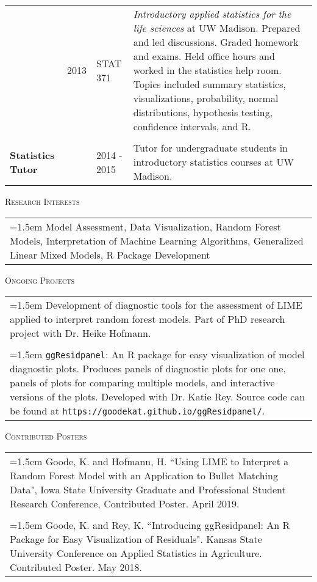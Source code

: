 \documentclass[10pt, oneside]{article}
\begin{document}
\begin{longtable}{p{2cm}p{1cm}p{2cm}p{11.5cm}}
\\
& \hfill{2013} & STAT 371 & \emph{Introductory applied statistics for the life sciences} at UW Madison. Prepared and led discussions. Graded homework and exams. Held office hours and worked in the statistics help room. Topics included summary statistics, visualizations, probability, normal distributions, hypothesis testing, confidence intervals, and R.\\
\\
\textbf{Statistics Tutor} & & 2014 - 2015 & Tutor for undergraduate students in introductory statistics courses at UW Madison.
\end{longtable}

\noindent \textsc{Research Interests} \hrulefill
\begin{longtable}{p{16.5cm}}
\hangindent=1.5em Model Assessment, Data Visualization, Random Forest Models, Interpretation of Machine Learning Algorithms, Generalized Linear Mixed Models, R Package Development
\end{longtable}

\noindent \textsc{Ongoing Projects} \hrulefill
\begin{longtable}{p{16.5cm}}
\hangindent=1.5em Development of diagnostic tools for the assessment of LIME applied to interpret random forest models. Part of PhD research project with Dr. Heike Hofmann.\\
\\
\hangindent=1.5em \texttt{ggResidpanel}: An R package for easy visualization of model diagnostic plots. Produces panels of diagnostic plots for one one, panels of plots for comparing multiple models, and interactive versions of the plots. Developed with Dr. Katie Rey. Source code can be found at \texttt{https://goodekat.github.io/ggResidpanel/}.
\end{longtable}

\noindent \textsc{Contributed Posters} \hrulefill
\begin{longtable}{p{16.5cm}}
\hangindent=1.5em Goode, K. and Hofmann, H. ``Using LIME to Interpret a Random Forest Model with an Application to Bullet Matching Data", Iowa State University Graduate and Professional Student Research Conference, Contributed Poster. April 2019.\\
\\ 
\hangindent=1.5em Goode, K. and Rey, K. ``Introducing ggResidpanel: An R Package for Easy Visualization of Residuals". Kansas State University Conference on Applied Statistics in Agriculture. Contributed Poster. May 2018.
\end{longtable}
\end{document}
